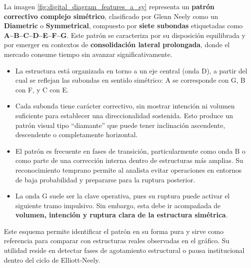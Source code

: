 \vspace{1em}

\noindent
La imagen \ref{fig:digital_diagram_features_a_sy} representa un \textbf{patr\'on correctivo complejo sim\'etrico}, clasificado por Glenn Neely como un \textbf{Diametric} o \textbf{Symmetrical}, compuesto por \textbf{siete subondas} etiquetadas como \textbf{A--B--C--D--E--F--G}. Este patr\'on se caracteriza por su disposici\'on equilibrada y por emerger en contextos de \textbf{consolidaci\'on lateral prolongada}, donde el mercado consume tiempo sin avanzar significativamente.

\begin{itemize}
    \item La estructura est\'a organizada en torno a un eje central (onda D), a partir del cual se reflejan las subondas en sentido sim\'etrico: A se corresponde con G, B con F, y C con E.    
    \item Cada subonda tiene car\'acter correctivo, sin mostrar intenci\'on ni volumen suficiente para establecer una direccionalidad sostenida. Esto produce un patr\'on visual tipo ``diamante'' que puede tener inclinaci\'on ascendente, descendente o completamente horizontal.    
    \item El patr\'on es frecuente en fases de transici\'on, particularmente como onda B o como parte de una correcci\'on interna dentro de estructuras m\'as amplias. Su reconocimiento temprano permite al analista evitar operaciones en entornos de baja probabilidad y prepararse para la ruptura posterior.    
    \item La onda G suele ser la clave operativa, pues su ruptura puede activar el siguiente tramo impulsivo. Sin embargo, esta debe ir acompa\~nada de \textbf{volumen, intenci\'on y ruptura clara de la estructura sim\'etrica}.
\end{itemize}

\noindent
Este esquema permite identificar el patr\'on en su forma pura y sirve como referencia para comparar con estructuras reales observadas en el gr\'afico. Su utilidad reside en detectar fases de agotamiento estructural o pausa institucional dentro del ciclo de Elliott-Neely.


